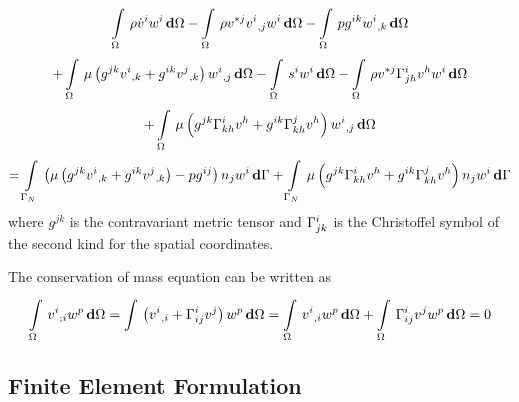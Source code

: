 \begin{multline}
  \gint{\Omega}{}{\rho\dot{v}^{i}w^{i}}{\Omega}
 -\gint{\Omega}{}{\rho v^{*j}\partialderiv{v^{i}}{j}w^{i}}{\Omega}
 -\gint{\Omega}{}{pg^{ik}\partialderiv{w^{i}}{k}}{\Omega}\\
 +\gint{\Omega}{}{\mu\pbrac{g^{jk}\partialderiv{v^{i}}{k}+g^{ik}\partialderiv{v^{j}}{k}}\partialderiv{w^{i}}{j}}{\Omega}
 -\gint{\Omega}{}{s^{i}w^{i}}{\Omega}
 -\gint{\Omega}{}{\rho v^{*j}\christoffel{i}{j}{h}v^{h}w^{i}}{\Omega}\\
 +\gint{\Omega}{}{\mu\pbrac{g^{jk}\christoffel{i}{k}{h}v^{h}+
     g^{ik}\christoffel{j}{k}{h}v^{h}}\partialderiv{w^{i}}{j}}{\Omega}\\
 =\gint{\Gamma_N}{}{\pbrac{\mu\pbrac{g^{jk}\partialderiv{v^{i}}{k}+g^{ik}\partialderiv{v^{j}}{k}}-pg^{ij}}n_{j}w^{i}}{\Gamma}
 +\gint{\Gamma_N}{}{\mu\pbrac{g^{jk}\christoffel{i}{k}{h}v^{h}+g^{ik}\christoffel{j}{k}{h}v^{h}}n_{j}w^{i}}{\Gamma}
 \label{eqn:Tensor3StokesEquation}
\end{multline}
where $g^{jk}$ is the contravariant metric tensor and $ \Gamma^{i}_{jk} $
is the Christoffel symbol of the second kind for the spatial coordinates.

The conservation of mass equation can be written as
\begin{equation}
  \gint{\Omega}{}{\covarderiv{v^{i}}{i}w^{p}}{\Omega}=
  \gint{}{}{\pbrac{\partialderiv{v^{i}}{i}+\christoffel{i}{i}{j}v^{j}}w^{p}}{\Omega}=
  \gint{\Omega}{}{\partialderiv{v^{i}}{i}w^{p}}{\Omega}+\gint{\Omega}{}{\christoffel{i}{i}{j}v^{j}w^{p}}{\Omega}=0
  \label{eqn:TensorStokesMass}
\end{equation}

\subsection{Finite Element Formulation}

